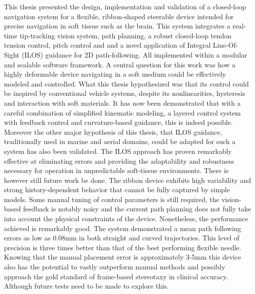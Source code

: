
This thesis presented the design, implementation and validation of a closed-loop navigation system for a flexible, ribbon-shaped steerable device intended for precise navigation in soft tissue such as the brain. This system integrates a real-time tip-tracking vision system, path planning, a robust closed-loop tendon tension control, pitch control and and a novel application of Integral Line-Of-Sight (ILOS) guidance for 2D path-following. All implemented within a modular and scalable software framework.
\newline \newline
A central question for this work was how a highly deformable device navigating in a soft medium could be effectively modeled and controlled. What this thesis hypothesized was that its control could be inspired by conventional vehicle systems, despite its nonlinearities, hysteresis and interaction with soft materials. It has now been demonstrated that with a careful combination of simplified kinematic modeling, a layered control system with feedback control and curvature-based guidance, this is indeed possible. Moreover the other major hypothesis of this thesis, that ILOS guidance, traditionally used in marine and aerial domains, could be adapted for such a system has also been validated. The ILOS approach has proven remarkably effective at eliminating errors and providing the adaptability and robustness necessary for operation in unpredictable soft-tissue environments.
\newline \newline
There is however still future work be done. The ribbon device exhibits high variability and strong history-dependent behavior that cannot be fully captured by simple models. Some manual tuning of control parameters is still required, the vision-based feedback is notably noisy and the current path planning does not fully take into account the physical constraints of the device.
\newline \newline
Nonetheless, the performance achieved is remarkably good. The system demonstrated a mean path following errors as low as 0.08mm in both straight and curved trajectories. This level of precision is three times better than that of the best performing flexible needle. Knowing that the manual placement error is approximately 3-5mm \cite{rucker_sliding_2013} this device also has the potential to vastly outperform manual methods and possibly approach the gold standard of frame-based stereotaxy in clinical accuracy. Although future tests need to be made to explore this.
